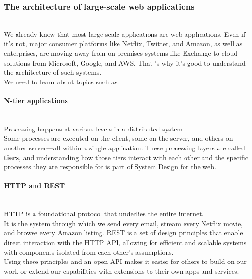 \subsubsection{The architecture of large-scale web applications}\label{3p8svxAoCHpdZLejxHViu}
\\
We already know that most large-scale applications are web applications. Even if it's not, major consumer platforms like Netflix, Twitter, and Amazon, as well as enterprises, are moving away from on-premises systems like Exchange to cloud solutions from Microsoft, Google, and AWS. That 's why it's good to understand the architecture of such systems.
\\
We need to learn about topics such as:
\\
\paragraph{N-tier applications}\label{w2_JW1jZ-X5kbVp55LzMo}
\\
Processing happens at various levels in a distributed system.
\\
Some processes are executed on the client, some on the server, and others on another server---all within a single application. These processing layers are called \textbf{tiers}, and understanding how those tiers interact with each other and the specific processes they are responsible for is part of System Design for the web.
\\
\paragraph{HTTP and REST}\label{_MZ3zIEJ_eeAMn9PYBoyO}
\\
\href{https://www.educative.io/courses/grokking-the-product-architecture-interview/hypertext-transfer-protocol-http}{\ul{HTTP}} is a foundational protocol that underlies the entire internet.
\\
It is the system through which we send every email, stream every Netflix movie, and browse every Amazon listing. \href{https://www.educative.io/courses/grokking-the-product-architecture-interview/representational-state-transfer-rest-web-architecture-style}{\ul{REST}} is a set of design principles that enable direct interaction with the HTTP API, allowing for efficient and scalable systems with components isolated from each other's assumptions.
\\
Using these principles and an open API makes it easier for others to build on our work or extend our capabilities with extensions to their own apps and services.
\\
